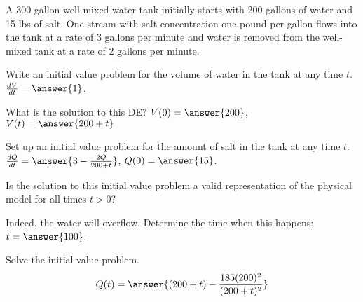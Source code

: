 \documentclass{ximera}
\begin{document}
\begin{exercise}
    A 300 gallon well-mixed water tank initially starts with 200 gallons of water and 15 lbs of salt. One stream with salt concentration one pound per gallon flows into the tank at a rate of 3 gallons per minute and water is removed from the well-mixed tank at a rate of 2 gallons per minute.
    
    Write an initial value problem for the volume of water in the tank at any time $t$. $\frac{dV}{dt} = \answer{1}$.
    
    \begin{problem}
        What is the solution to this DE? $V(0) = \answer{200}$, $V(t) = \answer{200 + t}$
    \end{problem}
    
    Set up an initial value problem for the amount of salt in the tank at any time $t$. $\frac{dQ}{dt} = \answer{3 - \frac{2Q}{200+t}}$, $Q(0) = \answer{15}$.
    
    \begin{problem}
        Is the solution to this initial value problem a valid representation of the physical model for all times $t > 0$?
        \begin{multipleChoice}
        \end{multipleChoice}
        \begin{problem}
            Indeed, the water will overflow. Determine the time when this happens: $t = \answer{100}$.
            \begin{problem}
                Solve the initial value problem.
                \[
                    Q(t) = \answer{(200 + t) - \frac{185(200)^2}{(200+t)^2}}
                \]
            \end{problem}
        \end{problem}
    \end{problem}
\end{exercise}
\end{document}
